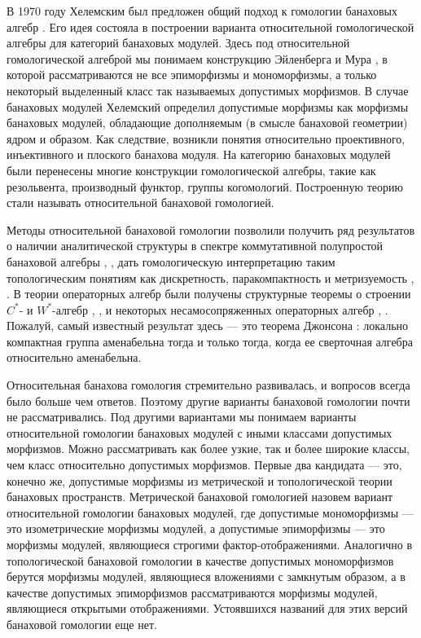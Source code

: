 В 1970 году Хелемским был предложен общий подход к гомологии банаховых алгебр \cite{HelemHomolDimNorModBanAlg}. Его идея состояла в построении варианта относительной гомологической алгебры для категорий банаховых модулей. Здесь под относительной гомологической алгеброй мы понимаем конструкцию Эйленберга и Мура \cite{EilenbergMooreFoundOfRelHomolAlg}, в которой рассматриваются не все эпиморфизмы и мономорфизмы, а только некоторый выделенный класс так называемых допустимых морфизмов. В случае банаховых модулей Хелемский определил допустимые морфизмы как морфизмы банаховых модулей, обладающие дополняемым (в смысле банаховой геометрии) ядром и образом. Как следствие, возникли понятия относительно проективного, инъективного и плоского банахова модуля. На категорию банаховых модулей были перенесены многие конструкции гомологической алгебры, такие как резольвента, производный функтор, группы когомологий. Построенную теорию стали называть относительной банаховой гомологией. 

Методы относительной банаховой гомологии позволили получить ряд результатов о наличии аналитической структуры в спектре коммутативной полупростой банаховой алгебры \cite{PugachProjAndFlatIdealOfBanAlg}, \cite{PugachHmolPropFuncAlgAndAnalytPolyDiscs}, дать гомологическую интерпретацию таким топологическим понятиям как дискретность, паракомпактность \cite{HelemDescRelProjIdealCOmega} и метризуемость \cite{KurmakDependStrctHomolDimOfCOmegaOnOmega}, \cite{SelivanovHomolDimOfCyclMod}. В теории операторных алгебр были получены структурные теоремы о строении 
$C^*$- и $W^*$-алгебр \cite{HelemHomolEssenceConnAmen}, \cite{HelemProjHomolClassifOfCStarAlg}, \cite{HelemWedderburnTypeThForOpAlgAndMod} и некоторых несамосопряженных операторных алгебр \cite{GolovibHomolPropHilbModOverNestOpAlg}, \cite{GolovinSpatProjPropInClOfCSLAlg}. Пожалуй, самый известный результат здесь --- это теорема Джонсона \cite{JohnsonCohomolBanAlg}: локально компактная группа аменабельна тогда и только тогда, когда ее сверточная алгебра относительно аменабельна.

Относительная банахова гомология стремительно развивалась, и вопросов всегда было больше чем ответов. Поэтому другие варианты банаховой гомологии почти не рассматривались. Под другими вариантами мы понимаем варианты относительной гомологии банаховых модулей с иными классами допустимых морфизмов. Можно рассматривать как более узкие, так и более широкие классы, чем класс относительно допустимых морфизмов. Первые два кандидата --- это, конечно же, допустимые морфизмы из метрической и топологической теории банаховых пространств. Метрической банаховой гомологией назовем вариант относительной гомологии банаховых модулей, где допустимые мономорфизмы --- это изометрические морфизмы модулей, а допустимые эпиморфизмы --- это морфизмы модулей, являющиеся строгими фактор-отображениями. Аналогично в топологической банаховой гомологии в качестве допустимых мономорфизмов берутся морфизмы модулей, являющиеся вложениями с замкнутым образом, а в качестве допустимых эпиморфизмов рассматриваются морфизмы модулей, являющиеся открытыми отображениями. Устоявшихся названий для этих версий банаховой гомологии еще нет.

